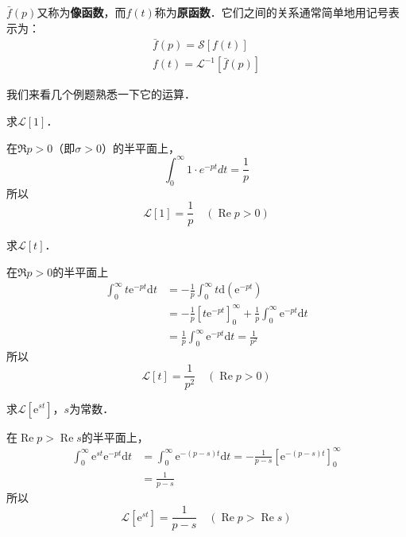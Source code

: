 $\bar f(p)$又称为\textbf{像函数}，而$f(t)$称为\textbf{原函数}．它们之间的关系通常简单地用记号表示为：
\begin{equation}
\begin{array}{l}\bar{f}(p)=\mathscr{S}[f(t)] \\ f(t)=\mathscr{L}^{-1}[\bar{f}(p)]\end{array}
\end{equation}

我们来看几个例题熟悉一下它的运算．

\begin{example}{}
求$\mathscr L[1]$．

在$\Re p>0$（即$\sigma>0$）的半平面上，
\begin{equation}
\int_{0}^{\infty} 1 \cdot e^{-p t} d t=\frac{1}{p}
\end{equation}
所以
\begin{equation}
\mathscr{L}[1]=\frac{1}{p} \quad(\operatorname{Re} p>0)
\end{equation}
\end{example}

\begin{example}{}
求$\mathscr L[t]$．

在$\Re p>0$的半平面上
\begin{equation}
\begin{aligned} \int_{0}^{\infty} t \mathrm{e}^{-p t} \mathrm{d} t &=-\frac{1}{p} \int_{0}^{\infty} t \mathrm{d}\left(\mathrm{e}^{-p t}\right) \\ &=-\frac{1}{p}\left[t \mathrm{e}^{-p t}\right]_{0}^{\infty}+\frac{1}{p} \int_{0}^{\infty} \mathrm{e}^{-p t} \mathrm{d} t \\ &=\frac{1}{p} \int_{0}^{\infty} \mathrm{e}^{-p t} \mathrm{d} t=\frac{1}{p^{2}} \end{aligned}
\end{equation}
所以
\begin{equation}
\mathscr{L}[t]=\frac{1}{p^{2}} \quad(\operatorname{Re} p>0)
\end{equation}
\end{example}

\begin{example}{}
求$\mathscr L[\mathrm e^{st}]$，$s$为常数．

在$\operatorname{Re} p>\operatorname{Re} s$的半平面上，
\begin{equation}
\begin{aligned} \int_{0}^{\infty} \mathrm{e}^{s t} \mathrm{e}^{-p t} \mathrm{d} t &=\int_{0}^{\infty} \mathrm{e}^{-(p-s) t} \mathrm{d} t=-\frac{1}{p-s}\left[\mathrm{e}^{-(p-s) t}\right]_{0}^{\infty} \\ &=\frac{1}{p-s} \end{aligned}
\end{equation}
所以
\begin{equation}
\mathscr{L}\left[\mathrm{e}^{st}\right]=\frac{1}{p-s} \quad(\operatorname{Re} p>\operatorname{Re} s)
\end{equation}
\end{example}

